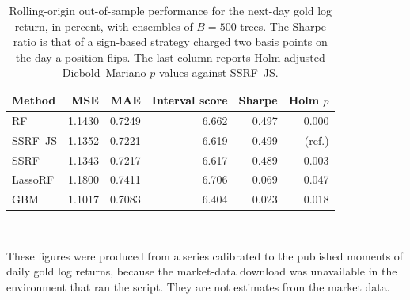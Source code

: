 \begin{table}[htbp]
\centering
\caption{Rolling-origin out-of-sample performance for the next-day gold log return, in percent, with ensembles of $B=500$ trees. The Sharpe ratio is that of a sign-based strategy charged two basis points on the day a position flips. The last column reports Holm-adjusted Diebold--Mariano $p$-values against SSRF--JS.}
\label{tab:gold_B500}
\small
\setlength{\tabcolsep}{5pt}
\begin{tabular}{lrrrrr}
\toprule
Method & MSE & MAE & Interval score & Sharpe & Holm $p$ \\
\midrule
RF & 1.1430 & 0.7249 & 6.662 & 0.497 & 0.000 \\
SSRF--JS & 1.1352 & 0.7221 & 6.619 & 0.499 & (ref.) \\
SSRF & 1.1343 & 0.7217 & 6.617 & 0.489 & 0.003 \\
LassoRF & 1.1800 & 0.7411 & 6.706 & 0.069 & 0.047 \\
GBM & 1.1017 & 0.7083 & 6.404 & 0.023 & 0.018 \\
\bottomrule
\end{tabular}
\\[2pt]
\parbox{\textwidth}{\footnotesize These figures were produced from a series calibrated to the published moments of daily gold log returns, because the market-data download was unavailable in the environment that ran the script. They are not estimates from the market data.}
\end{table}

